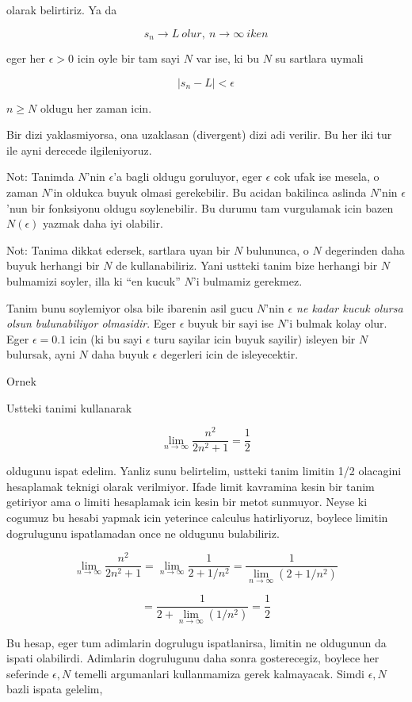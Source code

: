 \documentclass[12pt,fleqn]{article}\usepackage{../common}
\begin{document}
olarak belirtiriz. Ya da

\[ s_n \to L \ olur, \ n \to \infty \ iken \]

eger her $\epsilon > 0$ icin oyle bir tam sayi $N$ var ise, ki bu $N$ su
sartlara uymali

\[ |s_n - L| < \epsilon  \]

$n \ge N$ oldugu her zaman icin. 

Bir dizi yaklasmiyorsa, ona uzaklasan (divergent) dizi adi verilir. Bu her
iki tur ile ayni derecede ilgileniyoruz. 

Not: Tanimda $N$'nin $\epsilon$'a bagli oldugu goruluyor, eger $\epsilon$
cok ufak ise mesela, o zaman $N$'in oldukca buyuk olmasi
gerekebilir. Bu acidan bakilinca aslinda $N$'nin $\epsilon$'nun bir
fonksiyonu oldugu soylenebilir. Bu durumu tam vurgulamak icin bazen
$N(\epsilon)$ yazmak daha iyi olabilir. 

Not: Tanima dikkat edersek, sartlara uyan bir $N$ bulununca, o $N$
degerinden daha buyuk herhangi bir $N$ de kullanabiliriz. Yani ustteki
tanim bize herhangi bir $N$ bulmamizi soyler, illa ki ``en kucuk'' $N$'i
bulmamiz gerekmez. 

Tanim bunu soylemiyor olsa bile ibarenin asil gucu $N$'nin {\em $\epsilon$
  ne kadar kucuk olursa olsun bulunabiliyor olmasidir}. Eger $\epsilon$
buyuk bir sayi ise $N$'i bulmak kolay olur. Eger $\epsilon = 0.1$ icin (ki
bu sayi $\epsilon$ turu sayilar icin buyuk sayilir) isleyen bir $N$
bulursak, ayni $N$ daha buyuk  $\epsilon$ degerleri icin de isleyecektir. 

Ornek 

Ustteki tanimi kullanarak 

\[ \lim_{n \to \infty } \frac{n^2}{2n^2 + 1} = \frac{1}{2} \]

oldugunu ispat edelim. Yanliz sunu belirtelim, ustteki tanim limitin 1/2
olacagini hesaplamak teknigi olarak verilmiyor. Ifade limit kavramina kesin
bir tanim getiriyor ama o limiti hesaplamak icin kesin bir metot
sunmuyor. Neyse ki cogumuz bu hesabi yapmak icin yeterince calculus
hatirliyoruz, boylece limitin dogrulugunu ispatlamadan once ne oldugunu
bulabiliriz.

\[ \lim_{n \to \infty } \frac{n^2}{2n^2 + 1}  =
\lim_{n \to \infty } \frac{1}{2 + 1/n^2} =
\frac{1}{\lim_{n \to \infty }(2 + 1/n^2)} 
\]

\[ = \frac{1}{2 + \lim_{n \to \infty }(1/n^2)}  = \frac{1}{2} \]

Bu hesap, eger tum adimlarin dogrulugu ispatlanirsa, limitin ne oldugunun
da ispati olabilirdi. Adimlarin dogrulugunu daha sonra gosterecegiz,
boylece her seferinde $\epsilon,N$ temelli argumanlari kullanmamiza gerek
kalmayacak. Simdi  $\epsilon,N$ bazli ispata gelelim, 
\end{document}
